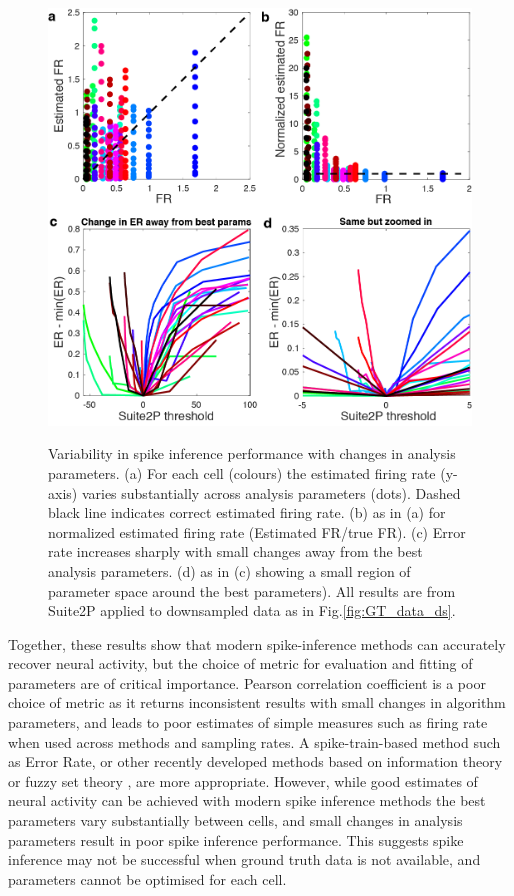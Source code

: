 \documentclass[a4paper,10pt,twocolumn]{article}
\begin{document}
\begin{figure}[h!]
{\includegraphics[width=\textwidth]{full_figs/why_deconvolve_F1_4_colours.png}}
{\caption{Variability in spike inference performance with changes in analysis parameters. (a) For each cell (colours) the estimated firing rate (y-axis) varies substantially across analysis parameters (dots). Dashed black line indicates correct estimated firing rate. (b) as in (a) for normalized estimated firing rate (Estimated FR/true FR). (c) Error rate increases sharply with small changes away from the best analysis parameters. (d) as in (c) showing a small region of parameter space around the best parameters). All results are from Suite2P applied to downsampled data as in Fig.\ref{fig:GT_data_ds}.
\label{fig:GT_param_performance}}}
\end{figure}

Together, these results show that modern spike-inference methods can accurately recover neural activity, but the choice of metric for evaluation and fitting of parameters are of critical importance. Pearson correlation coefficient is a poor choice of metric as it returns inconsistent results with small changes in algorithm parameters, and leads to poor estimates of simple measures such as firing rate when used across methods and sampling rates. A spike-train-based method such as Error Rate\citep{Deneux2016-gu, Victor1996-cg}, or other recently developed methods based on information theory \citep{Theis2016-ee} or fuzzy set theory \citep{Reynolds2017-dr}, are more appropriate. However, while good estimates of neural activity can be achieved with modern spike inference methods the best parameters vary substantially between cells, and small changes in analysis parameters result in poor spike inference performance. This suggests spike inference may not be successful when ground truth data is not available, and parameters cannot be optimised for each cell.
\end{document}
